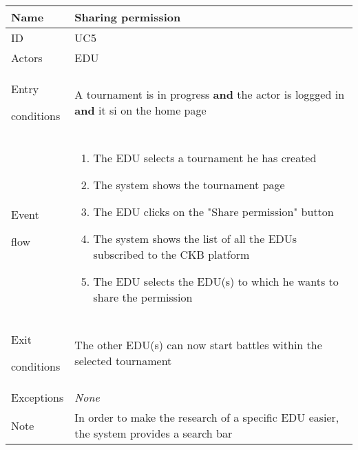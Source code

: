 \begin{center}
    \def\arraystretch{1.5}
    \begin{tabular}{| m{2cm} | m{10cm}|}
        \hline
        Name                  & Sharing permission                                                                                   \\ \hline
        ID                    & UC5                                                                                                  \\ \hline
        Actors                & EDU                                                                                                  \\ \hline
        Entry \par conditions & A tournament is in progress \textbf{and} the actor is loggged in \textbf{and} it si on the home page \\ \hline
        Event \par flow       & \begin{enumerate}
                                    \item The EDU selects a tournament he has created
                                    \item The system shows the tournament page
                                    \item The EDU clicks on the "Share permission" button
                                    \item The system shows the list of all the EDUs subscribed to the CKB platform
                                    \item The EDU selects the EDU(s) to which he wants to share the permission
                                \end{enumerate}                        \\ \hline
        Exit \par conditions  & The other EDU(s) can now start battles within the selected tournament                                \\ \hline
        Exceptions            & \textit{None}                                                                                        \\ \hline
        Note                  & In order to make the research of a specific EDU easier, the system provides a search bar             \\ \hline
    \end{tabular}
\end{center}

